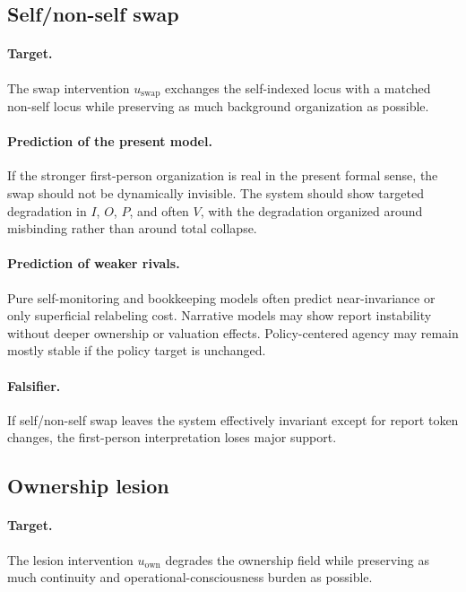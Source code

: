 \documentclass[11pt,a4paper]{article}
\theoremstyle{definition}
\newcommand{\SelfIndex}{I}
\newcommand{\OwnField}{O}
\newcommand{\Persp}{P}
\newcommand{\ValAsym}{V}
\begin{document}
\subsection{Self/non-self swap}
\paragraph{Target.} The swap intervention $u_{\mathrm{swap}}$ exchanges the self-indexed locus with a matched non-self locus while preserving as much background organization as possible.

\paragraph{Prediction of the present model.} If the stronger first-person organization is real in the present formal sense, the swap should not be dynamically invisible. The system should show targeted degradation in $\SelfIndex$, $\OwnField$, $\Persp$, and often $\ValAsym$, with the degradation organized around misbinding rather than around total collapse.

\paragraph{Prediction of weaker rivals.} Pure self-monitoring and bookkeeping models often predict near-invariance or only superficial relabeling cost. Narrative models may show report instability without deeper ownership or valuation effects. Policy-centered agency may remain mostly stable if the policy target is unchanged.

\paragraph{Falsifier.} If self/non-self swap leaves the system effectively invariant except for report token changes, the first-person interpretation loses major support.

\subsection{Ownership lesion}
\paragraph{Target.} The lesion intervention $u_{\mathrm{own}}$ degrades the ownership field while preserving as much continuity and operational-consciousness burden as possible.
\end{document}

